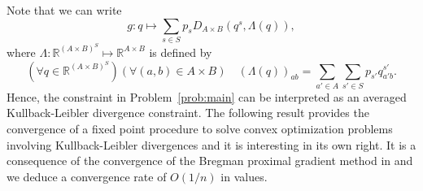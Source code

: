 \documentclass[smallextended,referee,envcountsect,]{svjour3}
\newcommand{\R}{{\mathbb R}}
\begin{document}
Note that we can write
\begin{equation}
\label{e:defg?}
g\colon q \mapsto 
\sum\limits_{s\in S}p_sD_{A\times B}(q^s,\Lambda(q)),
\end{equation}
where $\Lambda\colon \R^{(A\times B)^S}\mapsto \R^{A\times 
B}$ is 
defined 
by
$$(\forall q\in \R^{(A\times B)^S})(\forall (a,b)\in A\times B)\quad 
(\Lambda(q))_{ab}=\sum_{a'\in 
A}\sum_{s'\in S}p_{s'}q_{a'b}^{s'}.$$
Hence, the constraint in Problem~\ref{prob:main} can be 
interpreted as an averaged Kullback-Leibler divergence constraint.
The following result 
provides the convergence of a fixed point procedure to solve 
convex 
optimization problems involving Kullback-Leibler divergences and 
it is interesting in its own right.
It {is a consequence of the convergence of} the 
Bregman proximal 
gradient method in \cite{BauMOR,Teboulle18} and we deduce a
{convergence rate} of $O(1/n)$ in values. 
\end{document}
